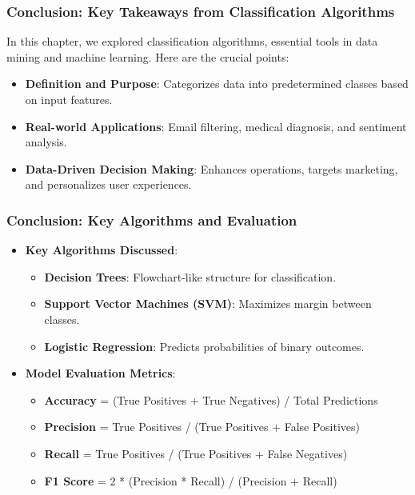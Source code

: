 \documentclass[aspectratio=169]{beamer}
\begin{document}
\begin{frame}[fragile]
    \frametitle{Conclusion: Key Takeaways from Classification Algorithms}
    In this chapter, we explored classification algorithms, essential tools in data mining and machine learning. Here are the crucial points:
    \begin{itemize}
        \item \textbf{Definition and Purpose}: Categorizes data into predetermined classes based on input features.
        \item \textbf{Real-world Applications}: Email filtering, medical diagnosis, and sentiment analysis.
        \item \textbf{Data-Driven Decision Making}: Enhances operations, targets marketing, and personalizes user experiences.
    \end{itemize}
\end{frame}

\begin{frame}[fragile]
    \frametitle{Conclusion: Key Algorithms and Evaluation}
    \begin{itemize}
        \item \textbf{Key Algorithms Discussed}:
        \begin{itemize}
            \item \textbf{Decision Trees}: Flowchart-like structure for classification.
            \item \textbf{Support Vector Machines (SVM)}: Maximizes margin between classes.
            \item \textbf{Logistic Regression}: Predicts probabilities of binary outcomes.
        \end{itemize}
        \item \textbf{Model Evaluation Metrics}:
        \begin{itemize}
            \item \textbf{Accuracy} = (True Positives + True Negatives) / Total Predictions
            \item \textbf{Precision} = True Positives / (True Positives + False Positives)
            \item \textbf{Recall} = True Positives / (True Positives + False Negatives)
            \item \textbf{F1 Score} = 2 * (Precision * Recall) / (Precision + Recall)
        \end{itemize}
    \end{itemize}
\end{frame}
\end{document}
